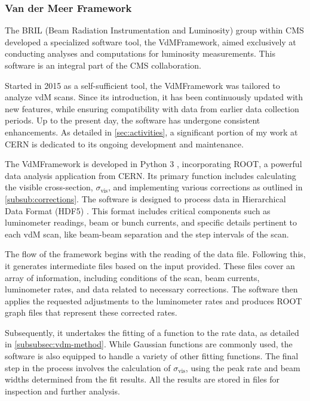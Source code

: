 \subsubsection{Van der Meer Framework}

The BRIL (Beam Radiation Instrumentation and Luminosity) group within CMS developed a specialized software tool, the VdMFramework, aimed exclusively at conducting analyses and computations for luminosity measurements. This software is an integral part of the CMS collaboration.

Started in 2015 as a self-sufficient tool, the VdMFramework was tailored to analyze vdM scans. Since its introduction, it has been continuously updated with new features, while ensuring compatibility with data from earlier data collection periods. Up to the present day, the software has undergone consistent enhancements. As detailed in \autoref{sec:activities}, a significant portion of my work at CERN is dedicated to its ongoing development and maintenance.

The VdMFramework is developed in Python 3 \cite{Python3}, incorporating ROOT, a powerful data analysis application from CERN. Its primary function includes calculating the visible cross-section, $\sigma_{\mathrm{vis}}$, and implementing various corrections as outlined in \autoref{subsub:corrections}. The software is designed to process data in Hierarchical Data Format (HDF5) \cite{koranne2011hierarchical}. This format includes critical components such as luminometer readings, beam or bunch currents, and specific details pertinent to each vdM scan, like beam-beam separation and the step intervals of the scan.

The flow of the framework begins with the reading of the data file. Following this, it generates intermediate files based on the input provided. These files cover an array of information, including conditions of the scan, beam currents, luminometer rates, and data related to necessary corrections. The software then applies the requested adjustments to the luminometer rates and produces ROOT graph files that represent these corrected rates.

Subsequently, it undertakes the fitting of a function to the rate data, as detailed in \autoref{subsubsec:vdm-method}. While Gaussian functions are commonly used, the software is also equipped to handle a variety of other fitting functions. The final step in the process involves the calculation of $\sigma_{\mathrm{vis}}$, using the peak rate and beam widths determined from the fit results. All the results are stored in files for inspection and further analysis.

